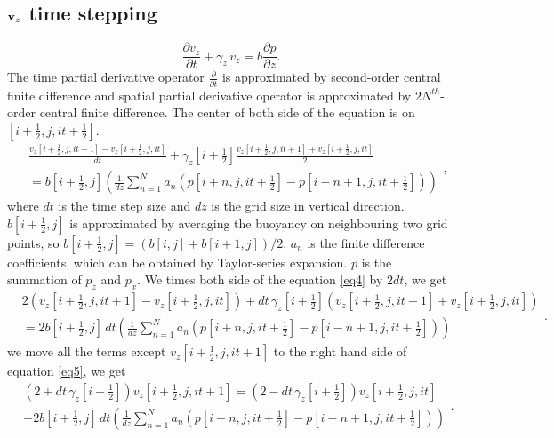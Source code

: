 \documentclass[revised,endfloat]{geophysics}
\begin{document}
\subsection{${\bf v}_z$ time stepping}
\begin{equation}
\frac{\partial v_z}{\partial t} + \gamma_z \, v_z = b \frac{\partial p}{\partial z}
\label{eq3}.
\end{equation}
The time partial derivative operator $\frac{\partial }{\partial t}$ is approximated by second-order central finite difference and spatial partial derivative operator is approximated by $2N^{th}$-order central finite difference. The center of both side of the equation is on $[i+\frac{1}{2},j,it+\frac{1}{2}]$. 
\begin{equation}
\begin{split}
&\frac{v_z[i+\frac{1}{2},j,it+1] - v_z[i+\frac{1}{2},j,it]}{dt} + \gamma_z[i+\frac{1}{2}]
\frac{v_z[i+\frac{1}{2},j,it+1] + v_z[i+\frac{1}{2},j,it]}{2}  \\
&= b[i+\frac{1}{2},j] \left( \frac{1}{dz} \sum_{n=1}^N  a_n \left( p[i+n,j,it+\frac{1}{2}] - p[i-n+1,j,it+\frac{1}{2}] \right) \right)
\end{split},
\label{eq4}
\end{equation}
where $dt$ is the time step size and $dz$ is the grid size in vertical direction. $b[i+\frac{1}{2},j]$ is approximated by averaging the buoyancy on neighbouring two grid points, so $b[i+\frac{1}{2},j] = (b[i,j] + b[i+1,j]) / 2 $. $a_n$ is the finite difference coefficients, which can be obtained by Taylor-series expansion. $p$ is the summation of $p_z$ and $p_x$. 
We times both side of the equation \ref{eq4} by $2dt$, we get 
\begin{equation}
\begin{split}
& 2(v_z[i+\frac{1}{2},j,it+1] - v_z[i+\frac{1}{2},j,it]) + dt\, \gamma_z[i+\frac{1}{2}]
(v_z[i+\frac{1}{2},j,it+1] + v_z[i+\frac{1}{2},j,it])  \\
& = 2b[i+\frac{1}{2},j] \, dt \left(\frac{1}{dz}  \sum_{n=1}^N  a_n \left( p[i+n,j,it+\frac{1}{2}] - p[i-n+1,j,it+\frac{1}{2}] \right) \right)
\end{split}.
\label{eq5}
\end{equation}
we move all the terms except $v_z[i+\frac{1}{2},j,it+1]$ to the right hand side of equation \ref{eq5}, we get
\begin{equation}
\begin{split}
&(2+ dt\, \gamma_z[i+\frac{1}{2}])v_z[i+\frac{1}{2},j,it+1] =  (2- dt\, \gamma_z[i+\frac{1}{2}])v_z[i+\frac{1}{2},j,it] \\
& + 2b[i+\frac{1}{2},j] \, dt \left( \frac{1}{dz} \sum_{n=1}^N  a_n \left( p[i+n,j,it+\frac{1}{2}] - p[i-n+1,j,it+\frac{1}{2}] \right)  \right)
\end{split}.
\label{eq6}
\end{equation}
\end{document}
